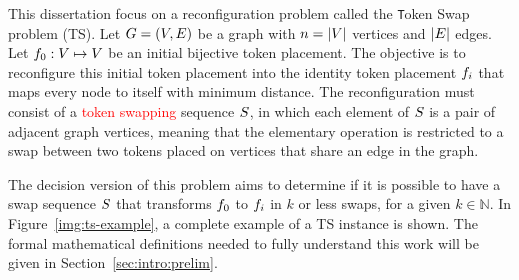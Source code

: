 \documentclass[msc,english,table,xcdraw]{ppgccufmg}
\begin{document}


This dissertation focus on a reconfiguration problem called the {\texttt Token
Swap} problem (TS).
Let $G = (V,E)$ be a graph with $n = |V|$  vertices and $|E|$ edges. Let $f_{0} : V \mapsto V$ be an initial bijective token placement.
The objective is to reconfigure this initial token placement into the identity token placement $f_{i}$ that maps every node to itself with minimum distance. 
The reconfiguration must consist of a \textcolor{red}{token swapping} sequence $S$, in which each element of $S$ is a pair of adjacent graph vertices, meaning that the elementary operation is restricted to a swap between two tokens placed on vertices that share an edge in the graph.


The decision version of this problem aims to determine if it is possible to have a swap sequence $S$ that transforms $f_{0}$ to $f_{i}$ in $k$ or less swaps, for a given $k \in \mathbb{N}$.
In Figure~\ref{img:ts-example}, a complete example of a TS instance is shown. The formal mathematical definitions needed to fully understand this work will be given in Section~\ref{sec:intro:prelim}.
\end{document}
